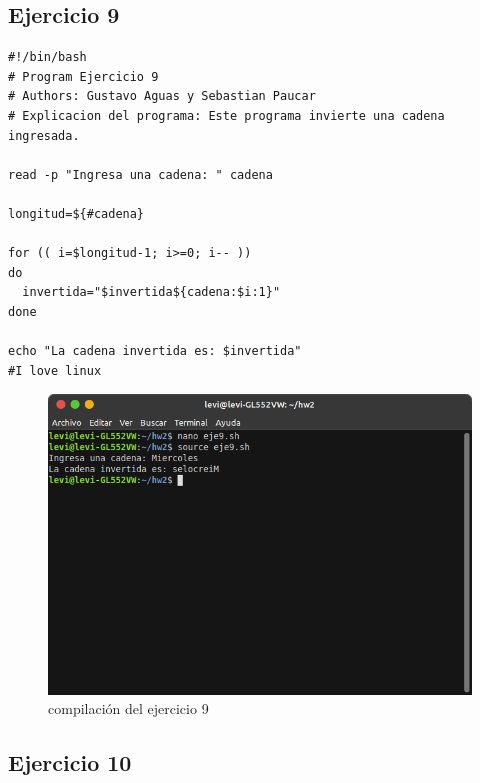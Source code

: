 \documentclass[11pt,twoside]{book}
\begin{document}
\subsection{Ejercicio 9}
\begin{lstlisting}
#!/bin/bash
# Program Ejercicio 9
# Authors: Gustavo Aguas y Sebastian Paucar
# Explicacion del programa: Este programa invierte una cadena ingresada.

read -p "Ingresa una cadena: " cadena

longitud=${#cadena}

for (( i=$longitud-1; i>=0; i-- ))
do
  invertida="$invertida${cadena:$i:1}"
done

echo "La cadena invertida es: $invertida"
#I love linux
\end{lstlisting}
\begin{figure}[h]
    \centering
    \includegraphics[width=0.8\linewidth]{Tarea2/teje9.png}
    \caption{ compilación del ejercicio 9}
\end{figure}
\newpage
\subsection{Ejercicio 10}
\end{document}
